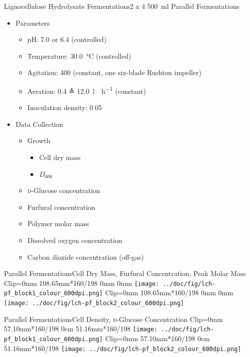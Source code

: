 \documentclass[mathserif]{beamer}
\newcommand{\SIdC}[1]{\SI{#1}{\celsius}} %
\newcommand{\SIml}[1]{\SI{#1}{\ml}} %
\newcommand{\SIrpm}[1]{\SI{#1}{\rpm}} %
\newcommand{\LCH}{Lignocellulose Hydrolysate}
\newcommand{\FUR}{Furfural}
\newcommand{\GLC}{\textsc{d}-Glu\-cose}
\begin{document}
\begin{frame}{\LCH{} Fermentations}{2 x 4 \SIml{500} Parallel Fermentations}
	\begin{itemize}
		\item Parameters
			\begin{itemize}
				\item pH: 7.0 or 6.4 (controlled)
				\pause
				\item Temperature: \SIdC{30.0} (controlled)
				\pause
				\item Agitation: \SIrpm{400} (constant, one six-blade Rushton impeller)
				\pause
				\item Aeration: \SI{0.4}{\vvm} ≙ \SI{12.0}{\litre\norm\per\hour} (constant)
				\pause
				\item Inoculation density: 0.05
			\end{itemize}
		\pause
		\item Data Collection
			\begin{itemize}
				\item Growth
					\begin{itemize}
						\item Cell dry mass
						\item $D_{600}$
					\end{itemize}
				\pause
				\item \GLC{} concentration
				\item \FUR{} concentration
				\pause
				\item Polymer molar mass
				\pause
				\item Dissolved oxygen concentration
				\item Carbon dioxide concentration (off-gas)
			\end{itemize}
	\end{itemize}
\end{frame}

\begin{frame}{Parallel Fermentations}{Cell Dry Mass, \FUR{} Concentration, Peak Molar Mass}
	\adjustbox
	{
		Clip=0mm 108.65mm*160/198 0mm 0mm
	}{
		\texttt{[image: ../doc/fig/lch-pf\_block1\_colour\_600dpi.png]}
	}
	\hfill
	\adjustbox
	{
		Clip=0mm 108.65mm*160/198 0mm 0mm
	}{
		\texttt{[image: ../doc/fig/lch-pf\_block2\_colour\_600dpi.png]}
	}
\end{frame}

\begin{frame}{Parallel Fermentations}{Cell Density, \GLC{} Concentration}
	\adjustbox
	{
		Clip=0mm 57.10mm*160/198 0cm 51.16mm*160/198
	}{
		\texttt{[image: ../doc/fig/lch-pf\_block1\_colour\_600dpi.png]}
	}
	\hfill
	\adjustbox
	{
		Clip=0mm 57.10mm*160/198 0cm 51.16mm*160/198
	}{
		\texttt{[image: ../doc/fig/lch-pf\_block2\_colour\_600dpi.png]}
	}
\end{frame}
\end{document}
